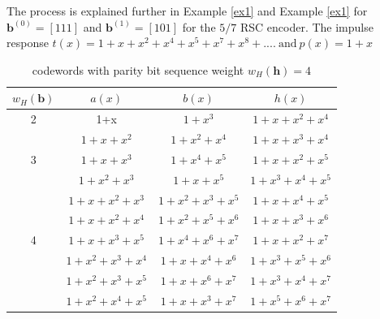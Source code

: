 \documentclass[fontsize=12pt]{article}
\begin{document}
 The process is explained further in Example  \ref{ex1}  and Example  \ref{ex1} for $\textbf{b}^{(0)}=[1 1 1]$ and  $\textbf{b}^{(1)}=[ 1 0 1]$ for the $5/7$ RSC encoder. The impulse response $t(x)=1+x+x^2+x^4+x^5+x^7+x^8+....~ \text{and}~p(x)=1+x$
 
 \begin{table}[h!]
 
 \caption{codewords with parity bit sequence weight $w_H(\textbf{h})=4$}
\centering
 \begin{tabular}{c c c c} 
 \hline
 $w_H(\textbf{b})$ & $a(x)$ & $b(x)$ & $h(x)$ \\ [0.5ex] 
 \hline\hline
 2 & 1+x & $1+x^3$ & $1+x+x^2+x^4$\\ 
 \hline 
  & $1+x+x^2$& $1+x^2+x^4$& $1+x+x^3+x^4$ \\
   3 & $1+x+x^3$& $1+x^4+x^5$ & $1+x+x^2+x^5$ \\
  & $1+x^2+x^3$ & $1+x+x^5$ & $1+x^3+x^4+x^5$ \\
  \hline 
  & $1+x+x^2+x^3 $ & $1+x^2+x^3+x^5$ & $1+x+x^4+x^5$ \\
  & $1+x+x^2+x^4 $ & $1+x^2+x^5+x^6$ & $1+x+x^3+x^6$ \\
 4 & $1+x+x^3+x^5 $ & $1+x^4+x^6+x^7$ & $1+x+x^2+x^7$\\ 
  & $1+x^2+x^3+x^4 $ & $1+x+x^4+x^6$ & $1+x^{3}+x^5+x^6$ \\ 
  & $1+x^2+x^3+x^5 $ & $1+x+x^6+x^7$ & $1+x^{3}+x^4+x^7$ \\  
  & $1+x^2+x^4+x^5 $ & $1+x+x^3+x^7$ & $1+x^5+x^6+x^7$ \\ 
 [1ex]
 \hline
 \end{tabular}
 \label{tab2}
\end{table}
\end{document}

